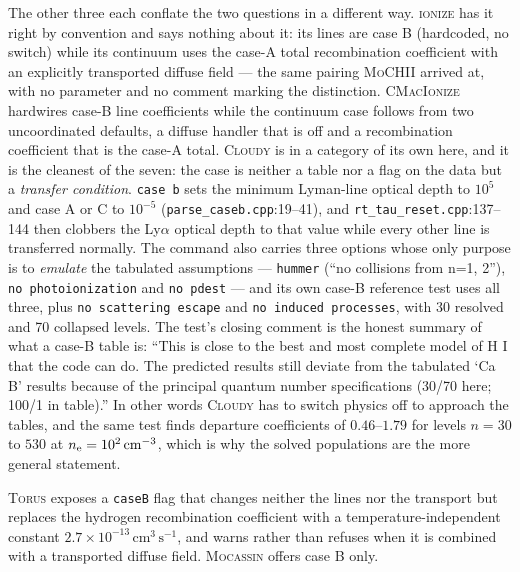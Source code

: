 \documentclass[english,a4paper]{my_memo}
\newcommand{\code}[1]{\texttt{#1}}
\newcommand{\MoCHII}{\textsc{MoCHII}}
\newcommand{\Wood}{\textsc{ionize}}
\newcommand{\CMI}{\textsc{CMacIonize}}
\newcommand{\Torus}{\textsc{Torus}}
\newcommand{\Mocassin}{\textsc{Mocassin}}
\newcommand{\Cloudy}{\textsc{Cloudy}}
\newcommand{\nelec}{n_{\rm e}}
\begin{document}
The other three each conflate the two questions in a different way.  \Wood{}
has it right by convention and says nothing about it: its lines are case B
(hardcoded, no switch) while its continuum uses the case-A total
recombination coefficient with an explicitly transported diffuse field --- the
same pairing \MoCHII{} arrived at, with no parameter and no comment marking
the distinction.  \CMI{} hardwires case-B line coefficients while the
continuum case follows from two uncoordinated defaults, a diffuse handler
that is off and a recombination coefficient that is the case-A total.
\Cloudy{} is in a category of its own here, and it is the cleanest of the
seven: the case is neither a table nor a flag on the data but a \emph{transfer
condition}.  \code{case b} sets the minimum Lyman-line optical depth to
$10^{5}$ and case A or C to $10^{-5}$ (\code{parse\_caseb.cpp}:19--41), and
\code{rt\_tau\_reset.cpp}:137--144 then clobbers the Ly$\alpha$ optical depth
to that value while every other line is transferred normally.  The command also
carries three options whose only purpose is to \emph{emulate} the tabulated
assumptions --- \code{hummer} (``no collisions from n=1, 2''),
\code{no photoionization} and \code{no pdest} --- and its own case-B
reference test uses all three, plus \code{no scattering escape} and
\code{no induced processes}, with 30 resolved and 70 collapsed levels.  The
test's closing comment is the honest summary of what a case-B table is:
``This is close to the best and most complete model of H I that the code can
do.  The predicted results still deviate from the tabulated `Ca B' results
because of the principal quantum number specifications (30/70 here; 100/1 in
table).''  In other words \Cloudy{} has to switch physics off to approach the
tables, and the same test finds departure coefficients of $0.46$--$1.79$ for
levels $n = 30$ to $530$ at $\nelec = 10^{2}\,\mathrm{cm^{-3}}$, which is why
the solved populations are the more general statement.

\Torus{} exposes a \code{caseB} flag that changes neither the lines nor the
transport but replaces the hydrogen recombination coefficient with a
temperature-independent constant $2.7\times10^{-13}\,\mathrm{cm^3\,s^{-1}}$,
and warns rather than refuses when it is combined with a transported diffuse
field.  \Mocassin{} offers case B only.
\end{document}
